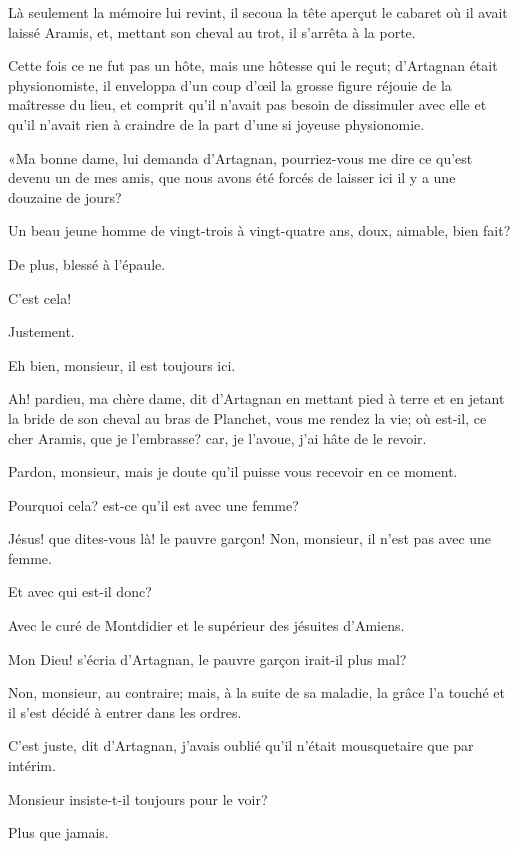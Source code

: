 Là seulement la mémoire lui revint, il secoua la tête aperçut le cabaret où il avait laissé Aramis, et, mettant son cheval au trot, il s'arrêta à la porte. 

Cette fois ce ne fut pas un hôte, mais une hôtesse qui le reçut; d'Artagnan était physionomiste, il enveloppa d'un coup d'œil la grosse figure réjouie de la maîtresse du lieu, et comprit qu'il n'avait pas besoin de dissimuler avec elle et qu'il n'avait rien à craindre de la part d'une si joyeuse physionomie. 

«Ma bonne dame, lui demanda d'Artagnan, pourriez-vous me dire ce qu'est devenu un de mes amis, que nous avons été forcés de laisser ici il y a une douzaine de jours? 

\speak  Un beau jeune homme de vingt-trois à vingt-quatre ans, doux, aimable, bien fait? 

\speak  De plus, blessé à l'épaule. 

\speak  C'est cela! 

\speak  Justement. 

\speak  Eh bien, monsieur, il est toujours ici. 

\speak  Ah! pardieu, ma chère dame, dit d'Artagnan en mettant pied à terre et en jetant la bride de son cheval au bras de Planchet, vous me rendez la vie; où est-il, ce cher Aramis, que je l'embrasse? car, je l'avoue, j'ai hâte de le revoir. 

\speak  Pardon, monsieur, mais je doute qu'il puisse vous recevoir en ce moment. 

\speak  Pourquoi cela? est-ce qu'il est avec une femme? 

\speak  Jésus! que dites-vous là! le pauvre garçon! Non, monsieur, il n'est pas avec une femme. 

\speak  Et avec qui est-il donc? 

\speak  Avec le curé de Montdidier et le supérieur des jésuites d'Amiens. 

\speak  Mon Dieu! s'écria d'Artagnan, le pauvre garçon irait-il plus mal? 

\speak  Non, monsieur, au contraire; mais, à la suite de sa maladie, la grâce l'a touché et il s'est décidé à entrer dans les ordres. 

\speak  C'est juste, dit d'Artagnan, j'avais oublié qu'il n'était mousquetaire que par intérim. 

\speak  Monsieur insiste-t-il toujours pour le voir? 

\speak  Plus que jamais. 

